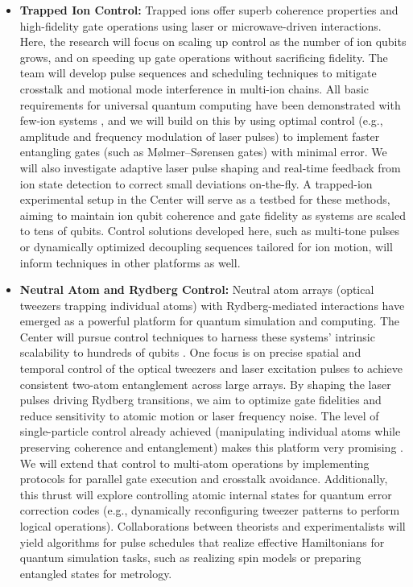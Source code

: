 \documentclass[11pt]{article}
\begin{document}
\begin{itemize}
   \item \textbf{Trapped Ion Control:} Trapped ions offer superb coherence properties and high-fidelity gate operations using laser or microwave-driven interactions. Here, the research will focus on scaling up control as the number of ion qubits grows, and on speeding up gate operations without sacrificing fidelity. The team will develop pulse sequences and scheduling techniques to mitigate crosstalk and motional mode interference in multi-ion chains. All basic requirements for universal quantum computing have been demonstrated with few-ion systems \cite{Bruzewicz19}, and we will build on this by using optimal control (e.g., amplitude and frequency modulation of laser pulses) to implement faster entangling gates (such as Mølmer–Sørensen gates) with minimal error. We will also investigate adaptive laser pulse shaping and real-time feedback from ion state detection to correct small deviations on-the-fly. A trapped-ion experimental setup in the Center will serve as a testbed for these methods, aiming to maintain ion qubit coherence and gate fidelity as systems are scaled to tens of qubits. Control solutions developed here, such as multi-tone pulses or dynamically optimized decoupling sequences tailored for ion motion, will inform techniques in other platforms as well.
   \item \textbf{Neutral Atom and Rydberg Control:} Neutral atom arrays (optical tweezers trapping individual atoms) with Rydberg-mediated interactions have emerged as a powerful platform for quantum simulation and computing. The Center will pursue control techniques to harness these systems' intrinsic scalability to hundreds of qubits \cite{Henriet20}. One focus is on precise spatial and temporal control of the optical tweezers and laser excitation pulses to achieve consistent two-atom entanglement across large arrays. By shaping the laser pulses driving Rydberg transitions, we aim to optimize gate fidelities and reduce sensitivity to atomic motion or laser frequency noise. The level of single-particle control already achieved (manipulating individual atoms while preserving coherence and entanglement) makes this platform very promising \cite{Henriet20}. We will extend that control to multi-atom operations by implementing protocols for parallel gate execution and crosstalk avoidance. Additionally, this thrust will explore controlling atomic internal states for quantum error correction codes (e.g., dynamically reconfiguring tweezer patterns to perform logical operations). Collaborations between theorists and experimentalists will yield algorithms for pulse schedules that realize effective Hamiltonians for quantum simulation tasks, such as realizing spin models or preparing entangled states for metrology.

\end{itemize}
\end{document}
